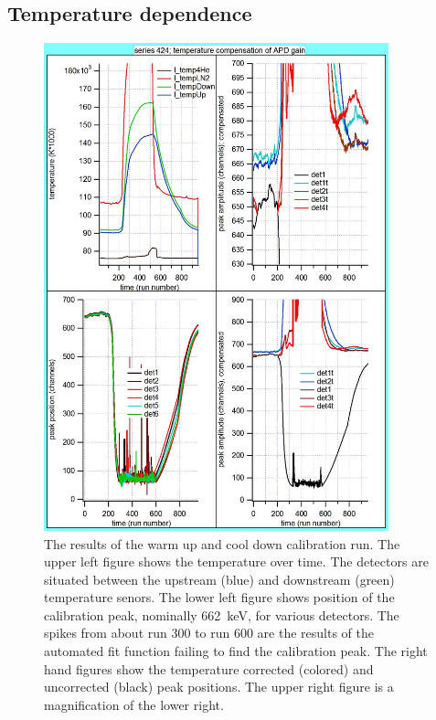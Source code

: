 \documentclass[oneside,12pt]{memoir}
\begin{document}
\subsection{Temperature dependence}
\label{sec:bgo_temp}
\begin{figure}[p]
	\centering
	\includegraphics[width=0.89\textwidth]
		{Layout_gain_temp_comp_424.jpg}
	\caption[Results of warm up/cool down calibration run.]
		{The results of the warm up and cool down calibration run. The upper left figure shows the temperature over time. The detectors are situated between the upstream (blue) and downstream (green) temperature senors. The lower left figure shows position of the calibration peak, nominally 662~keV, for various detectors. The spikes from about run 300 to run 600 are the results of the automated fit function failing to find the calibration peak. The right hand figures show the temperature corrected (colored) and uncorrected (black) peak positions. The upper right figure is a magnification of the lower right.}
	\label{fig:tempgain}
\end{figure}
\end{document}
